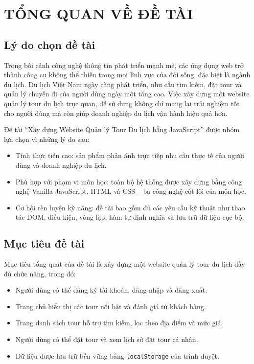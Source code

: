 \documentclass[12pt,a4paper]{article}
\begin{document}
\section{TỔNG QUAN VỀ ĐỀ TÀI}

\subsection{Lý do chọn đề tài}

Trong bối cảnh công nghệ thông tin phát triển mạnh mẽ, các ứng dụng web trở thành công cụ không thể thiếu trong mọi lĩnh vực của đời sống, đặc biệt là ngành du lịch. Du lịch Việt Nam ngày càng phát triển, nhu cầu tìm kiếm, đặt tour và quản lý chuyến đi của người dùng ngày một tăng cao. Việc xây dựng một website quản lý tour du lịch trực quan, dễ sử dụng không chỉ mang lại trải nghiệm tốt cho người dùng mà còn giúp doanh nghiệp du lịch vận hành hiệu quả hơn.

Đề tài ``Xây dựng Website Quản lý Tour Du lịch bằng JavaScript'' được nhóm lựa chọn vì những lý do sau:

\begin{itemize}[leftmargin=2cm]
  \item Tính thực tiễn cao: sản phẩm phản ánh trực tiếp nhu cầu thực tế của người dùng và doanh nghiệp du lịch.
  \item Phù hợp với phạm vi môn học: toàn bộ hệ thống được xây dựng bằng công nghệ Vanilla JavaScript, HTML và CSS -- ba công nghệ cốt lõi của môn học.
  \item Cơ hội rèn luyện kỹ năng: đề tài bao gồm đủ các yêu cầu kỹ thuật như thao tác DOM, điều kiện, vòng lặp, hàm tự định nghĩa và lưu trữ dữ liệu cục bộ.
\end{itemize}

\subsection{Mục tiêu đề tài}

Mục tiêu tổng quát của đề tài là xây dựng một website quản lý tour du lịch đầy đủ chức năng, trong đó:

\begin{itemize}[leftmargin=2cm]
  \item Người dùng có thể đăng ký tài khoản, đăng nhập và đăng xuất.
  \item Trang chủ hiển thị các tour nổi bật và đánh giá từ khách hàng.
  \item Trang danh sách tour hỗ trợ tìm kiếm, lọc theo địa điểm và mức giá.
  \item Người dùng có thể đặt tour và xem lịch sử đặt tour cá nhân.
  \item Dữ liệu được lưu trữ bền vững bằng \texttt{localStorage} của trình duyệt.
\end{itemize}
\end{document}
